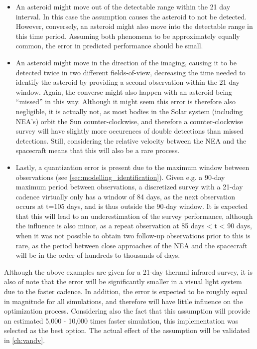 \begin{itemize}
 \item An asteroid might move out of the detectable range within the 21 day interval. In this case the assumption causes the asteroid to not be detected. However, conversely, an asteroid might also move into the detectable range in this time period. Assuming both phenomena to be approximately equally common, the error in predicted performance should be small.
 \item An asteroid might move in the direction of the imaging, causing it to be detected twice in two different fields-of-view, decreasing the time needed to identify the asteroid by providing a second observation within the 21 day window. Again, the converse might also happen with an asteroid being ``missed'' in this way. Although it might seem this error is therefore also negligible, it is actually not, as most bodies in the Solar system (including NEA's) orbit the Sun counter-clockwise, and therefore a counter-clockwise survey will have slightly more occurences of double detections than missed detections. Still, considering the relative velocity between the NEA and the spacecraft means that this will also be a rare process.
 \item Lastly, a quantization error is present due to the maximum window between observations (see \autoref{sec:modelling_identification}). Given e.g. a 90-day maximum period between observations, a discretized survey with a 21-day cadence virtually only has a window of 84 days, as the next observation occurs at t=105 days, and is thus outside the 90-day window. It is expected that this will lead to an underestimation of the survey performance, although the influence is also minor, as a repeat observation at 85 days < t < 90 days, when it was not possible to obtain two follow-up observations prior to this is rare, as the period between close approaches of the NEA and the spacecraft will be in the order of hundreds to thousands of days.
\end{itemize}
Although the above examples are given for a 21-day thermal infrared survey, it is also of note that the error will be significantly smaller in a visual light system due to the faster cadence. In addition, the error is expected to be roughly equal in magnitude for all simulations, and therefore will have little influence on the optimization process. Considering also the fact that this assumption will provide an estimated 5,000 - 10,000 times faster simulation, this implementation was selected as the best option. The actual effect of the assumption will be validated in \autoref{ch:vandv}.


